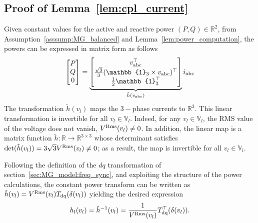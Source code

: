 \documentclass[journal, final, letterpaper]{IEEEtran}
\newcommand{\ts}[1]{{\textnormal{#1}}}
\newcommand{\Rset}{\mathbb{R}}
\newcommand{\mbb}{\mathbb}
\begin{document}
\subsection{Proof of Lemma~\ref{lem:cpl_current}}
\label{sec:proof2}
%
%
Given constant values for the active and reactive power $(P,Q)\in\Rset^{2}$, from Assumption~\ref{asssump:MG_balanced} and Lemma~\ref{lem:power_computation}, the powers can be expressed in matrix form as follows
%
\begin{equation*}
  \begin{bmatrix}P\\Q\\0\end{bmatrix} = \underbrace{\begin{bmatrix}v_\ts{abc}^\top\\\frac{\sqrt{3}}{3} (\mbb{1}_{3} \times v_\ts{abc})^\top\\\frac{1}{2}\mbb{1}_3^\top\end{bmatrix}}_{\tilde{h}(v_\ts{abc})} i_\ts{abc}
\end{equation*}
%
The transformation $\tilde{h}(v_l)$ maps the $3-$phase currents to $\Rset^{3}$. This linear transformation is invertible for all $v_l\in\mbb{V}_{l}$. Indeed, for any $v_l\in\mbb{V}_l$, the RMS value of the voltage does not vanish, $V^\ts{Rms}(v_l)\neq 0$. In addition, the linear map is a matrix function $\tilde{h}:\Rset\rightarrow\Rset^{3\times 3}$ whose determinant satisfies $\det(\tilde{h}(v_l)) = 3\sqrt{3}V^\ts{Rms}(v_l)\neq 0$; as a result, the map is invertible for all $v_l\in\mbb{V}_l$. 

Following the definition of the $dq$ transformation of section~\ref{sec:MG_model:freq_sync}, and exploiting the structure of the power calculations, the constant power transform can be written as $\tilde{h}(v_l) = {V^\ts{Rms}(v_l)} T_\ts{dq}(\delta(v_l))$ yielding the desired expression  
\begin{equation*}
		h_l(v_l) = \tilde{h}^{-1}(v_l) = \frac{1}{V^\ts{Rms}(v_l)}T_\ts{dq}^\top(\delta(v_l)).
\end{equation*}
\end{document}
